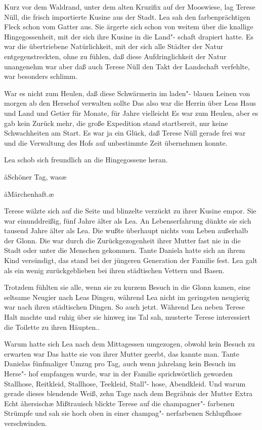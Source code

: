 Kurz vor dem Waldrand, unter dem alten Kruzifix auf der
Mooswiese, lag Terese Nüll, die frisch importierte Kusine
aus der Stadt. Lea sah den farbenprächtigen Fleck schon vom
Gatter aus. Sie ärgerte sich schon von weitem über die
knallige Hingegossenheit, mit der sich ihre Kusine in die Land"-%
schaft drapiert hatte. Es war die übertriebene Natürlichkeit,
mit der sich alle Städter der Natur entgegenstreckten, ohne zu
fühlen, daß diese Aufdringlichkeit der Natur unangenehm
war\dopp{} aber daß auch Terese Nüll den Takt der Landschaft
verfehlte, war besonders schlimm.

War es nicht zum Heulen, daß diese Schwärmerin im laden"-%
blauen Leinen von morgen ab den Hersehof verwalten sollte\frag{}
Das also war die Herrin über Leas Haus und Land und
Getier für Monate, für Jahre vielleicht\frag{} Es war zum Heulen,
aber es gab kein Zurück mehr, die große Expedition stand
startbereit, nur keine Schwachheiten am Start. Es war ja
ein Glück, daß Terese Nüll gerade frei war und die Verwaltung
des Hofs auf unbestimmte Zeit übernehmen konnte.

Lea schob sich freundlich an die Hingegossene heran.

\aa{}Schöner Tag, was\frag{}\ae{}

\aa{}Märchenhaft.\ae{}

Terese wälzte sich auf die Seite und blinzelte verzückt zu ihrer
Kusine empor. Sie war einunddreißig, fünf Jahre älter als
Lea. An Lebenserfahrung dünkte sie sich tausend Jahre älter
als Lea. Die wußte überhaupt nichts vom Leben außerhalb
der Glonn. Die war durch die Zurückgezogenheit ihrer Mutter
fast nie in die Stadt oder unter die Menschen gekommen. Tante
Daniela hatte sich an ihrem Kind versündigt, das stand bei
der jüngeren Generation der Familie fest. Lea galt als ein
wenig zurückgeblieben bei ihren städtischen Vettern und Basen.

Trotzdem fühlten sie alle, wenn sie zu kurzem Besuch in die
Glonn kamen, eine seltsame Neugier nach Leas Dingen,
während Lea nicht im geringsten neugierig war nach ihren
städtischen Dingen. So auch jetzt. Während Lea neben Terese
Halt machte und ruhig über sie hinweg ins Tal sah, musterte
Terese interessiert die Toilette zu ihren Häupten..

Warum hatte sich Lea nach dem Mittagessen umgezogen,
obwohl kein Besuch zu erwarten war\frag{} Das hatte sie von ihrer
Mutter geerbt, das kannte man. Tante Danielas fünfmaliger
Umzug pro Tag, auch wenn jahrelang kein Besuch im Herse"-%
hof empfangen wurde, war in der Familie sprichwörtlich
geworden\dopp{} Stallhose, Reitkleid, Stallhose, Teekleid, Stall"-%
hose, Abendkleid. Und warum gerade dieses blendende Weiß,
zehn Tage nach dem Begräbnis der Mutter\frag{} Extra\frag{} Echt
\aa{}hersisch\ae{}\ausr{} Mißtrauisch blickte Terese auf die champagner"-%
farbenen Strümpfe und sah sie hoch oben in einer champag"-%
nerfarbenen Schlupfhose verschwinden.

